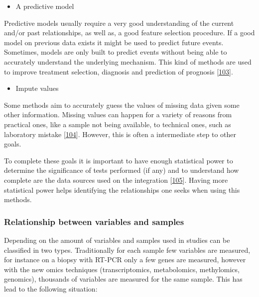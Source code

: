 \documentclass[
  a4paper,
]{book}
\providecommand{\tightlist}{%
  \setlength{\itemsep}{0pt}\setlength{\parskip}{0pt}}
\begin{document}
\begin{itemize}
\tightlist
\item
  A predictive model
\end{itemize}

Predictive models usually require a very good understanding of the current and/or past relationships, as well as, a good feature selection procedure.
If a good model on previous data exists it might be used to predict future events.
Sometimes, models are only built to predict events without being able to accurately understand the underlying mechanism.
This kind of methods are used to improve treatment selection, diagnosis and prediction of prognosis {[}\protect\hyperlink{ref-wheeler2014}{103}{]}.

\begin{itemize}
\tightlist
\item
  Impute values
\end{itemize}

Some methods aim to accurately guess the values of missing data given some other information.
Missing values can happen for a variety of reasons from practical ones, like a sample not being available, to technical ones, such as laboratory mistake {[}\protect\hyperlink{ref-yin2019}{104}{]}.
However, this is often a intermediate step to other goals.

To complete these goals it is important to have enough statistical power to determine the significance of tests performed (if any) and to understand how complete are the data sources used on the integration {[}\protect\hyperlink{ref-tarazona2021}{105}{]}.
Having more statistical power helps identifying the relationships one seeks when using this methods.

\hypertarget{relationship-between-variables-and-samples}{%
\subsubsection{Relationship between variables and samples}\label{relationship-between-variables-and-samples}}

Depending on the amount of variables and samples used in studies can be classified in two types.
Traditionally for each sample few variables are measured, for instance on a biopsy with RT-PCR only a few genes are measured, however with the new omics techniques (transcriptomics, metabolomics, methylomics, genomics), thousands of variables are measured for the same sample.
This has lead to the following situation:
\end{document}
